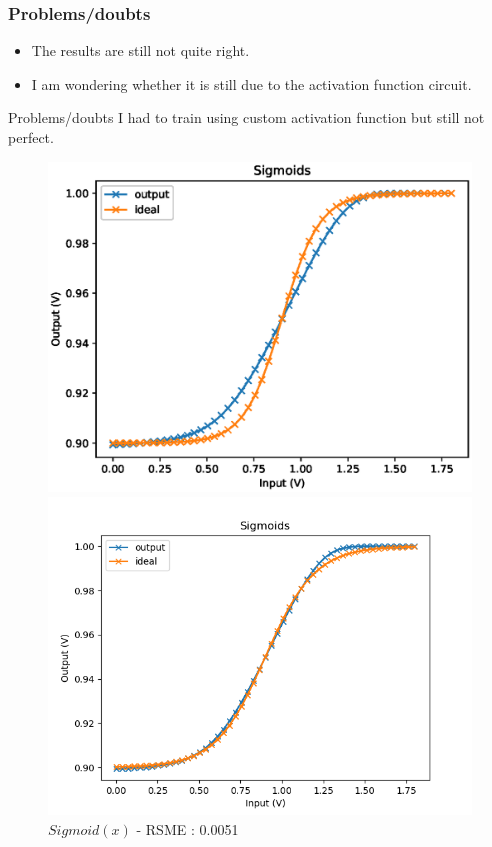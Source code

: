 \documentclass[table]{beamer}
\begin{document}
  \begin{frame}
    \frametitle{Problems/doubts}
    \begin{itemize}
      \item The results are still not quite right.
      \item I am wondering whether it is still due to the activation function circuit.
    \end{itemize}
  \end{frame}

  \begin{frame}{Problems/doubts}
    I had to train using custom activation function but still not perfect.
    \begin{figure}[!tbp]
      \centering
      \begin{minipage}[b]{0.4\textwidth}
        \centering
        \includegraphics[width=\textwidth]{activation/sigmoid}
        \caption{ $Sigmoid(x)$ - RSME : 0.0051}
      \end{minipage}
      \hspace{20pt}
      \begin{minipage}[b]{0.4\textwidth}
        \centering
        \includegraphics[width=\textwidth]{activation/cSigmoid}

\end{minipage}
\end{figure}
\end{frame}
\end{document}

